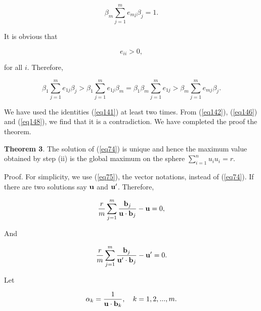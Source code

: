 \documentclass [18pt]{article}
\begin{document}
\begin{equation}
\label{eq146}
\beta _m \sum\limits_{j = 1}^m {e_{mj} \beta _j = 1} .
\end{equation}



It is obvious that


\begin{equation}
\label{eq147}
e_{ii} > 0,
\end{equation}



\noindent
for all $i$. Therefore,


\begin{equation}
\label{eq148}
\beta _1 \sum\limits_{j = 1}^m {e_{1j} \beta _j > } \beta _1 \sum\limits_{j
= 1}^m {e_{1j} \beta _m = } \beta _1 \beta _m \sum\limits_{j = 1}^m {e_{1j}
} > \beta _m \sum\limits_{j = 1}^m {e_{mj} } \beta _j .
\end{equation}



We have used the identities (\ref{eq141}) at least two times. From (\ref{eq142}), (\ref{eq146}) and
(\ref{eq148}), we find that it is a contradiction. We have completed the proof the
theorem.

\textbf{Theorem 3}. The solution of (\ref{eq74}) is unique and hence the maximum
value obtained by step (ii) is the global maximum on the sphere
$\sum\limits_{i = 1}^n {u_i u_i } = r$.

Proof. For simplicity, we use (\ref{eq75}), the vector notations, instead of (\ref{eq74}).
If there are two solutions say ${\rm {\bf u}}$ and ${\rm {\bf u}}'$.
Therefore,


\begin{equation}
\label{eq149}
\frac{r}{m}\sum\limits_{j = 1}^m {\frac{{\rm {\bf b}}_j }{{\rm {\bf u}}
\cdot {\rm {\bf b}}_j }} - {\rm {\bf u}} = 0,
\end{equation}



And


\begin{equation}
\label{eq150}
\frac{r}{m}\sum\limits_{j = 1}^m {\frac{{\rm {\bf b}}_j }{{\rm {\bf u}}'
\cdot {\rm {\bf b}}_j }} - {\rm {\bf u}}' = 0.
\end{equation}



Let


\begin{equation}
\label{eq151}
\alpha _k = \frac{1}{{\rm {\bf u}} \cdot {\rm {\bf b}}_k },
\quad
k = 1,2,...,m.
\end{equation}
\end{document}

